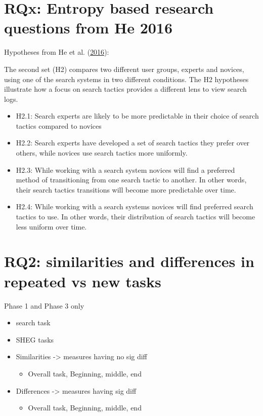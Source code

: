 \documentclass[letterpaper, nobind]{templates/ociamthesis}
\providecommand{\tightlist}{%
  \setlength{\itemsep}{0pt}\setlength{\parskip}{0pt}}
\begin{document}
\hypertarget{rqx-entropy-based-research-questions-from-he-2016}{%
\section{RQx: Entropy based research questions from He 2016}\label{rqx-entropy-based-research-questions-from-he-2016}}

Hypotheses from He et al. (\protect\hyperlink{ref-he2016beyond}{2016}):

The second set (H2) compares two different user groups, experts and novices, using one of the search systems in two different conditions. The H2 hypotheses illustrate how a focus on search tactics provides a different lens to view search logs.

\begin{itemize}
\tightlist
\item
  H2.1: Search experts are likely to be more predictable in their choice of search tactics compared to novices
\item
  H2.2: Search experts have developed a set of search tactics they prefer over others, while novices use search tactics more uniformly.
\item
  H2.3: While working with a search system novices will find a preferred method of transitioning from one search tactic to another. In other words, their search tactics transitions will become more predictable over time.
\item
  H2.4: While working with a search systems novices will find preferred search tactics to use. In other words, their distribution of search tactics will become less uniform over time.
\end{itemize}

\hypertarget{rq2-similarities-and-differences-in-repeated-vs-new-tasks}{%
\section{RQ2: similarities and differences in repeated vs new tasks}\label{rq2-similarities-and-differences-in-repeated-vs-new-tasks}}

Phase 1 and Phase 3 only

\begin{itemize}
\tightlist
\item
  search task
\item
  SHEG tasks
\item
  Similarities -\textgreater{} measures having no sig diff

  \begin{itemize}
  \tightlist
  \item
    Overall task, Beginning, middle, end
  \end{itemize}
\item
  Differences -\textgreater{} measures having sig diff

  \begin{itemize}
  \tightlist
  \item
    Overall task, Beginning, middle, end
  \end{itemize}
\end{itemize}
\end{document}
